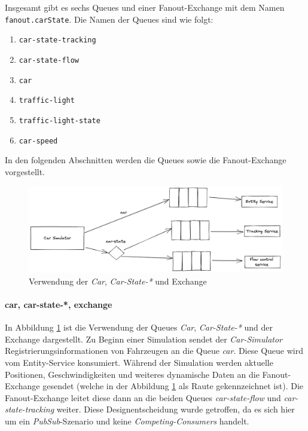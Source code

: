 Insgesamt gibt es sechs Queues und einer Fanout-Exchange mit dem Namen \verb|fanout.carState|.
Die Namen der Queues sind wie folgt:
\begin{enumerate}
	\item \verb|car-state-tracking| 
	\item \verb|car-state-flow| 
	\item \verb|car| 
	\item \verb|traffic-light| 
	\item \verb|traffic-light-state| 
	\item \verb|car-speed| 
\end{enumerate}

In den folgenden Abschnitten werden die Queues sowie die Fanout-Exchange vorgestellt.

\begin{figure}[h]
	\centering
	\includegraphics[width=1\textwidth]{./figures/car_simulator_mom.png}
	\caption{Verwendung der \textit{Car}, \textit{Car-State-*} und Exchange}
	\label{fig:car_simulator_mom}
\end{figure}

\paragraph{car, car-state-*, exchange}

In Abbildung \ref{fig:car_simulator_mom} ist die Verwendung der Queues \textit{Car}, \textit{Car-State-*} und der Exchange dargestellt.
Zu Beginn einer Simulation sendet der \textit{Car-Simulator} Registrierungsinformationen von Fahrzeugen an die Queue \textit{car}.
Diese Queue wird vom Entity-Service konsumiert.
Während der Simulation werden aktuelle Positionen, Geschwindigkeiten und weiteres dynamische Daten an die Fanout-Exchange gesendet (welche in der Abbildung \ref{fig:car_simulator_mom} als Raute gekennzeichnet ist).
Die Fanout-Exchange leitet diese dann an die beiden Queues \textit{car-state-flow} und \textit{car-state-tracking} weiter.
Diese Designentscheidung wurde getroffen, da es sich hier um ein \textit{PubSub}-Szenario und keine \textit{Competing-Consumers} handelt.

